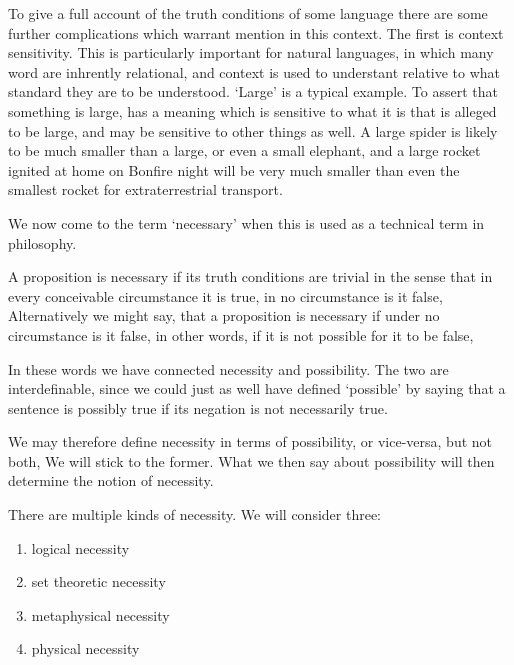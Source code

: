 To give a full account of the truth conditions of some language there are some further complications which warrant mention in this context.
The first is context sensitivity.
This is particularly important for natural languages, in which many word are inhrently relational, and context is used to understant relative to what standard they are to be understood.
`Large' is a typical example.
To assert that something is large, has a meaning which is sensitive to what it is that is alleged to be large, and may be sensitive to other things as well.
A large spider is likely to be much smaller than a large, or even a small elephant, and a large rocket ignited at home on Bonfire night will be very much smaller than even the smallest rocket for extraterrestrial transport.

We now come to the term `necessary' when this is used as a technical term in philosophy.

A proposition is necessary if its truth conditions are trivial in the sense that in every conceivable circumstance it is true, in no circumstance is it false,
Alternatively we might say, that a proposition is necessary if under no circumstance is it false, in other words, if it is not possible for it to be false,

In these words we have connected necessity and possibility.
The two are interdefinable, since we could just as well have defined `possible' by saying that a sentence is possibly true if its negation is not necessarily true.

We may therefore define necessity in terms of possibility, or vice-versa, but not both,
We will stick to the former.
What we then say about possibility will then determine the notion of necessity.

There are multiple kinds of necessity.
We will consider three:

\begin{enumerate}
\item logical necessity
\item set theoretic necessity
\item metaphysical necessity
\item physical necessity
\end{enumerate}

  
